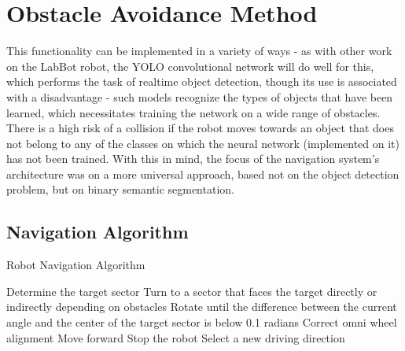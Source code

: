 \documentclass[11pt, a4paper, openany]{book}
\begin{document}
\section{Obstacle Avoidance Method}
This functionality can be implemented in a variety of ways - as with other work on the LabBot robot, the YOLO convolutional network will do well for this, which performs the task of realtime object detection, though its use is associated with a disadvantage - such models recognize the types of objects that have been learned, which necessitates training the network on a wide range of obstacles. There is a high risk of a collision if the robot moves towards an object that does not belong to any of the classes on which the neural network (implemented on it) has not been trained.\newline
With this in mind, the focus of the navigation system's architecture was on a more universal approach, based not on the object detection problem, but on binary semantic segmentation.\cite{li2020vision}
\subsection{Navigation Algorithm}

\begin{algorithm}
\caption{Robot Navigation Algorithm}
\begin{algorithmic}[1]
\State Determine the target sector
\State Turn to a sector that faces the target directly or indirectly depending on obstacles
\State Rotate until the difference between the current angle and the center of the target sector is below 0.1 radians
\State Correct omni wheel alignment
\State Move forward
\Else
\State Stop the robot
\State Select a new driving direction
\EndIf
\EndWhile
\EndProcedure
\end{algorithmic}
\end{algorithm}
\newpage
\end{document}
